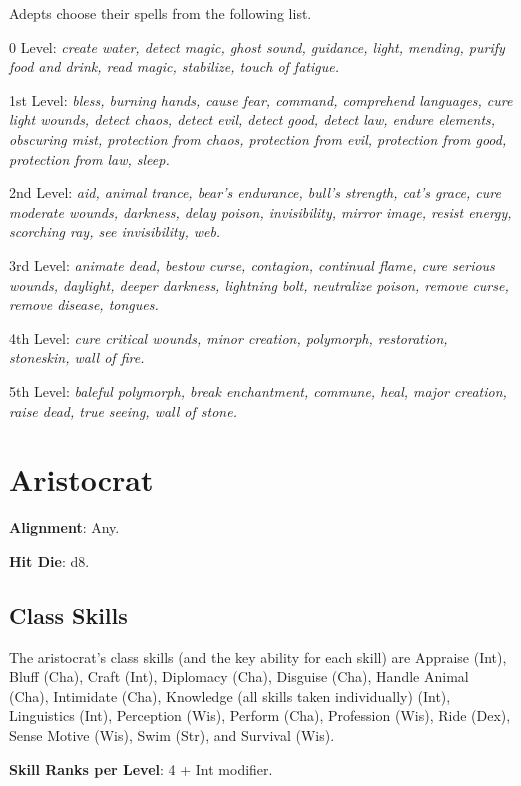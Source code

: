 				
Adepts choose their spells from the following list.
				
0 Level: \textit{create water, detect magic, ghost sound, guidance, light, mending, purify food and drink, read magic, stabilize, touch of fatigue.}
				
1st Level: \textit{bless, burning hands, cause fear, command, comprehend languages, cure light wounds, detect chaos, detect evil, detect good, detect law, endure elements, obscuring mist, protection from chaos, protection from evil, protection from good, protection from law, sleep.}
				
2nd Level: \textit{aid, animal trance, bear's endurance, bull's strength, cat's grace, cure moderate wounds, darkness, delay poison, invisibility, mirror image, resist energy, scorching ray, see invisibility, web.}
				
3rd Level: \textit{animate dead, bestow curse, contagion, continual flame, cure serious wounds, daylight, deeper darkness, lightning bolt, neutralize poison, remove curse, remove disease, tongues.}
				
4th Level: \textit{cure critical wounds, minor creation, polymorph, restoration, stoneskin, wall of fire.}
				
5th Level: \textit{baleful polymorph, break enchantment, commune, heal, major creation, raise dead, true seeing, wall of stone.}
				
\section{Aristocrat}

				
\textbf{Alignment}: Any.
				
\textbf{Hit Die}: d8.
				
\subsection{Class Skills}

				
The aristocrat's class skills (and the key ability for each skill) are Appraise (Int), Bluff (Cha), Craft (Int), Diplomacy (Cha), Disguise (Cha), Handle Animal (Cha), Intimidate (Cha), Knowledge (all skills taken individually) (Int), Linguistics (Int), Perception (Wis), Perform (Cha), Profession (Wis), Ride (Dex), Sense Motive (Wis), Swim (Str), and Survival (Wis). 
				
\textbf{Skill Ranks per Level}: 4 + Int modifier.
					
